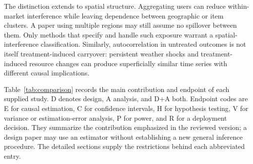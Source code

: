 \documentclass[12pt]{article}
\begin{document}
The distinction extends to spatial structure. Aggregating users can reduce within-market interference while leaving dependence between geographic or item clusters. A paper using multiple regions may still assume no spillover between them. Only methods that specify and handle such exposure warrant a spatial-interference classification. Similarly, autocorrelation in untreated outcomes is not itself treatment-induced carryover: persistent weather shocks and treatment-induced resource changes can produce superficially similar time series with different causal implications.

Table~\ref{tab:comparison} records the main contribution and endpoint of each supplied study. D denotes design, A analysis, and D+A both. Endpoint codes are E for causal estimation, C for confidence intervals, H for hypothesis testing, V for variance or estimation-error analysis, P for power, and R for a deployment decision. They summarize the contribution emphasized in the reviewed version; a design paper may use an estimator without establishing a new general inference procedure. The detailed sections supply the restrictions behind each abbreviated entry.
\end{document}
